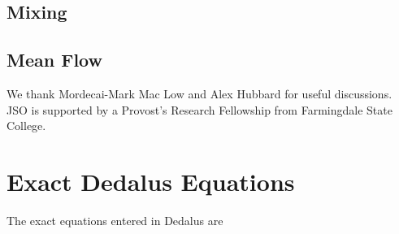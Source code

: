 \documentclass{jfm}
\begin{document}
\subsection{Mixing}
\label{sec:mixing}

\subsection{Mean Flow}
\label{sec:meanflow}


We thank Mordecai-Mark Mac Low and Alex Hubbard for useful
discussions. JSO is supported by a Provost's Research Fellowship from
Farmingdale State College.
\appendix
\section{Exact Dedalus Equations}
\label{sec:appendix_dedalus}
The exact equations entered in Dedalus are 



\end{document}
